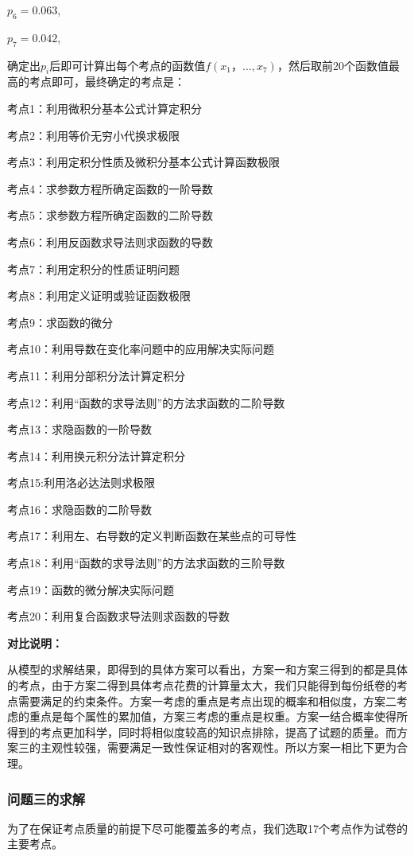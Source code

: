 \documentclass{ctexart}
\begin{document}
$p_{6}=0.063$,

$p_{7}=0.042$,

确定出$p_{i}$后即可计算出每个考点的函数值$f(x_{1}，...,x_{7})$，然后取前20个函数值最高的考点即可，最终确定的考点是：

考点1：利用微积分基本公式计算定积分

考点2：利用等价无穷小代换求极限

考点3：利用定积分性质及微积分基本公式计算函数极限

考点4：求参数方程所确定函数的一阶导数

考点5：求参数方程所确定函数的二阶导数

考点6：利用反函数求导法则求函数的导数

考点7：利用定积分的性质证明问题

考点8：利用定义证明或验证函数极限

考点9：求函数的微分

考点10：利用导数在变化率问题中的应用解决实际问题

考点11：利用分部积分法计算定积分

考点12：利用“函数的求导法则”的方法求函数的二阶导数
	
考点13：求隐函数的一阶导数

考点14：利用换元积分法计算定积分

考点15:利用洛必达法则求极限

考点16：求隐函数的二阶导数

考点17：利用左、右导数的定义判断函数在某些点的可导性

考点18：利用“函数的求导法则”的方法求函数的三阶导数

考点19：函数的微分解决实际问题

考点20：利用复合函数求导法则求函数的导数

\textbf{对比说明：}

从模型的求解结果，即得到的具体方案可以看出，方案一和方案三得到的都是具体的考点，由于方案二得到具体考点花费的计算量太大，我们只能得到每份纸卷的考点需要满足的约束条件。方案一考虑的重点是考点出现的概率和相似度，方案二考虑的重点是每个属性的累加值，方案三考虑的重点是权重。方案一结合概率使得所得到的考点更加科学，同时将相似度较高的知识点排除，提高了试题的质量。而方案三的主观性较强，需要满足一致性保证相对的客观性。所以方案一相比下更为合理。
\subsubsection{问题三的求解}

为了在保证考点质量的前提下尽可能覆盖多的考点，我们选取17个考点作为试卷的主要考点。
\end{document}
